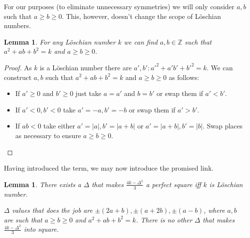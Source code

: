 \documentclass{article}
\theoremstyle{plain}
\newtheorem{lemma}[theorem]{Lemma}
\theoremstyle{definition}
\theoremstyle{remark}
\begin{document}
		For our purposes (to eliminate unnecessary symmetries) we will only consider $a,b$ such that $a \geq b \geq 0$. This, however, doesn't change the scope of Löschian numbers.
		
		\begin{lemma}
			\label{v3:lemma:loeschian}
			For any Löschian number $k$ we can find $a,b \in \mathbb Z$ such that $a^2+ab+b^2=k$ and $a \geq b \geq 0$.
		\end{lemma}
		
		\begin{proof}
			As $k$ is a Löschian number there are $a',b' \colon a'^2+a'b'+b'^2=k$. We can construct $a,b$ such that $a^2+ab+b^2=k$ and $a \geq b \geq 0$ as follows:
			\begin{itemize}
				\item If $a' \geq 0$ and $b' \geq 0$ just take $a=a'$ and $b=b'$ or swap them if $a'<b'$.
				\item If $a'<0,b'<0$ take $a'=-a,b'=-b$ or swap them if $a'>b'$.
				\item If $ab<0$ take either $a'=|a|, b'=|a+b|$ or $a'=|a+b|, b'=|b|$. Swap places as necessary to ensure $a \geq b \geq 0$.
			\end{itemize}
		\end{proof}
		
		Having introduced the term, we may now introduce the promised link.
		
		\begin{lemma}
			\label{v3:lemma:square}
			There exists a $\Delta$ that makes $\frac{4k-\Delta^2}{3}$ a perfect square iff $k$ is Löschian number.
			
			$\Delta$ values that does the job are $\pm (2a+b), \pm (a+2b), \pm (a-b)$, where $a,b$ are such that $a \geq b \geq 0$ and $a^2+ab+b^2=k$. There is no other $\Delta$ that makes $\frac{4k-\Delta^2}{3}$ into square.
		\end{lemma}
		
\end{document}
